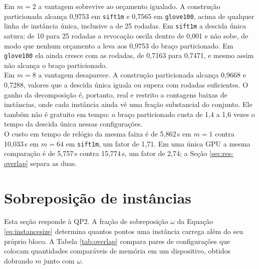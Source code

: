 Em $m = 2$ a vantagem sobrevive ao orçamento igualado. A construção particionada alcança 0,9753 em \texttt{sift1m} e 0,7565 em \texttt{glove100}, acima de qualquer linha de instância única, inclusive a de 25 rodadas. Em \texttt{sift1m} a descida única satura: de 10 para 25 rodadas a revocação oscila dentro de 0,001 e não sobe, de modo que nenhum orçamento a leva aos 0,9753 do braço particionado. Em \texttt{glove100} ela ainda cresce com as rodadas, de 0,7163 para 0,7471, e mesmo assim não alcança o braço particionado.\\

Em $m = 8$ a vantagem desaparece. A construção particionada alcança 0,9668 e 0,7288, valores que a descida única iguala ou supera com rodadas suficientes. O ganho da decomposição é, portanto, real e restrito a contagens baixas de instâncias, onde cada instância ainda vê uma fração substancial do conjunto. Ele também não é gratuito em tempo: o braço particionado custa de 1,4 a 1,6 vezes o tempo da descida única nessas configurações.\\

O custo em tempo de relógio da mesma faixa é de 5,862\,s em $m = 1$ contra 10,033\,s em $m = 64$ em \texttt{sift1m}, um fator de 1,71. Em uma única \ac{GPU} a mesma comparação é de 5,757\,s contra 15,774\,s, um fator de 2,74; a Seção \ref{sec:res-overlap} separa as duas.\\

\section{Sobreposição de instâncias\label{sec:res-overlap}}

Esta seção responde à QP2. A fração de sobreposição $\omega$ da Equação \eqref{eq:instancesize} determina quantos pontos uma instância carrega além do seu próprio bloco. A Tabela \ref{tab:overlap} compara pares de configurações que colocam quantidades comparáveis de memória em um dispositivo, obtidos dobrando $m$ junto com $\omega$.\\

